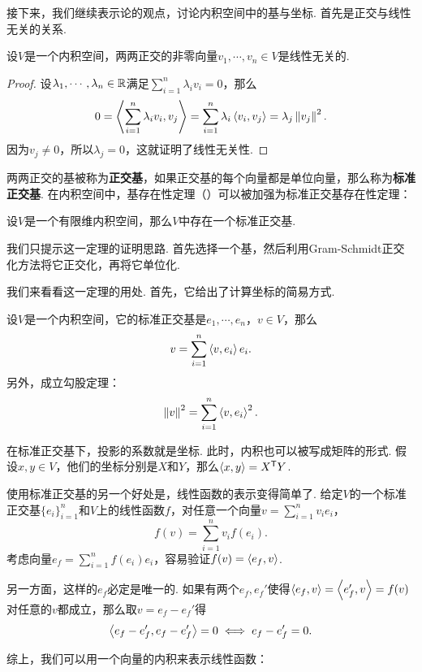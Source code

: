 接下来，我们继续表示论的观点，讨论内积空间中的基与坐标. 首先是正交与线性无关的关系. 

\begin{proposition}\label{prop:orthogonal}
设$V$是一个内积空间，两两正交的非零向量$v_1,\cdots,v_n\in V$是线性无关的. 
\end{proposition}
\begin{proof}
设$\lambda_1,\cdots,\lambda_n\in\mathbb{R}$满足$\sum_{i=1}^n\lambda_iv_i=0$，那么
\[
    0=\left\langle{\sum_{i=1}^n\lambda_iv_i},{v_j}\right\rangle=\sum_{i=1}^n\lambda_i\left\langle{v_i},{v_j}\right\rangle=\lambda_j\left\|v_j\right\|^2.
\]
因为$v_j\neq 0$，所以$\lambda_j=0$，这就证明了线性无关性. 
\end{proof}

两两正交的基被称为\textbf{正交基}，如果正交基的每个向量都是单位向量，那么称为\textbf{标准正交基}. 在内积空间中，基存在性定理（）可以被加强为标准正交基存在性定理：

\begin{theorem}[标准正交基存在性定理]\label{thm:orthogonal-basis}
设$V$是一个有限维内积空间，那么$V$中存在一个标准正交基. 
\end{theorem}

我们只提示这一定理的证明思路. 首先选择一个基，然后利用Gram-Schmidt正交化方法将它正交化，再将它单位化. 

我们来看看这一定理的用处. 首先，它给出了计算坐标的简易方式. 

\begin{proposition}\label{prop:projection}
设$V$是一个内积空间，它的标准正交基是$e_1,\cdots,e_n$，$v\in V$，那么
\[
    v=\sum_{i=1}^n\left\langle{v},{e_i}\right\rangle e_i.
\]
另外，成立勾股定理：
\[
    \left\|v\right\|^2=\sum_{i=1}^n\left\langle{v},{e_i}\right\rangle^2.
\]
\end{proposition}

在标准正交基下，投影的系数就是坐标. 此时，内积也可以被写成矩阵的形式. 假设$x,y\in V$，他们的坐标分别是$X$和$Y$，那么$\left\langle{x},{y}\right\rangle=X^{\mathsf{T}} Y$.

使用标准正交基的另一个好处是，线性函数的表示变得简单了. 给定$V$的一个标准正交基$\{e_i\}_{i=1}^n$和$V$上的线性函数$f$，对任意一个向量$v=\sum_{i=1}^nv_ie_i$，
\[f(v)=\sum_{i=1}^nv_if(e_i).\]
考虑向量$e_f=\sum_{i=1}^nf(e_i)e_i$，容易验证$f(v)=\left\langle{e_f},{v}\right\rangle$. 

另一方面，这样的$e_f$必定是唯一的. 如果有两个$e_f,e_f'$使得$\left\langle{e_f},{v}\right\rangle=\left\langle{e_f'},{v}\right\rangle=f(v)$对任意的$v$都成立，那么取$v=e_f-e_f'$得
\[\left\langle{e_f-e_f'},{e_f-e_f'}\right\rangle=0\iff e_f-e_f'=0.\]

综上，我们可以用一个向量的内积来表示线性函数：

